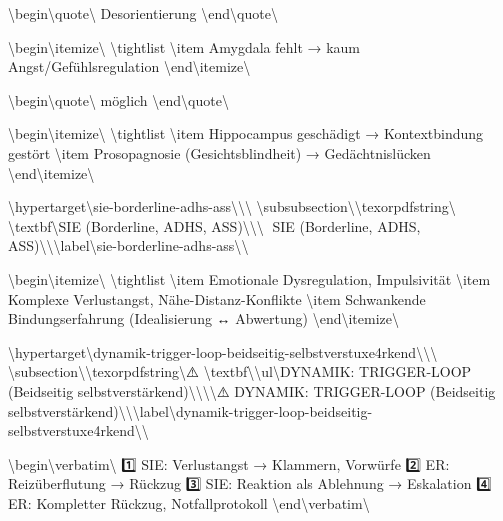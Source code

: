 \textbackslash{}begin\textbackslash{}{quote\textbackslash{}}
Desorientierung
\textbackslash{}end\textbackslash{}{quote\textbackslash{}}

\textbackslash{}begin\textbackslash{}{itemize\textbackslash{}}
\textbackslash{}tightlist
\textbackslash{}item
  Amygdala fehlt → kaum Angst/Gefühlsregulation
\textbackslash{}end\textbackslash{}{itemize\textbackslash{}}

\textbackslash{}begin\textbackslash{}{quote\textbackslash{}}
möglich
\textbackslash{}end\textbackslash{}{quote\textbackslash{}}

\textbackslash{}begin\textbackslash{}{itemize\textbackslash{}}
\textbackslash{}tightlist
\textbackslash{}item
  Hippocampus geschädigt → Kontextbindung gestört
\textbackslash{}item
  Prosopagnosie (Gesichtsblindheit) → Gedächtnislücken
\textbackslash{}end\textbackslash{}{itemize\textbackslash{}}

\textbackslash{}hypertarget\textbackslash{}{sie-borderline-adhs-ass\textbackslash{}}\textbackslash{}{\textbackslash{}%
\textbackslash{}subsubsection\textbackslash{}{\textbackslash{}texorpdfstring\textbackslash{}{🔴 \textbackslash{}textbf\textbackslash{}{SIE (Borderline, ADHS, ASS)\textbackslash{}}\textbackslash{}}\textbackslash{}{🔴 SIE (Borderline, ADHS, ASS)\textbackslash{}}\textbackslash{}}\textbackslash{}label\textbackslash{}{sie-borderline-adhs-ass\textbackslash{}}\textbackslash{}}

\textbackslash{}begin\textbackslash{}{itemize\textbackslash{}}
\textbackslash{}tightlist
\textbackslash{}item
  Emotionale Dysregulation, Impulsivität
\textbackslash{}item
  Komplexe Verlustangst, Nähe-Distanz-Konflikte
\textbackslash{}item
  Schwankende Bindungserfahrung (Idealisierung ↔ Abwertung)
\textbackslash{}end\textbackslash{}{itemize\textbackslash{}}

\textbackslash{}hypertarget\textbackslash{}{dynamik-trigger-loop-beidseitig-selbstverstuxe4rkend\textbackslash{}}\textbackslash{}{\textbackslash{}%
\textbackslash{}subsection\textbackslash{}{\textbackslash{}texorpdfstring\textbackslash{}{⚠️ \textbackslash{}textbf\textbackslash{}{\textbackslash{}ul\textbackslash{}{DYNAMIK: TRIGGER-LOOP (Beidseitig selbstverstärkend)\textbackslash{}}\textbackslash{}}\textbackslash{}}\textbackslash{}{⚠️ DYNAMIK: TRIGGER-LOOP (Beidseitig selbstverstärkend)\textbackslash{}}\textbackslash{}}\textbackslash{}label\textbackslash{}{dynamik-trigger-loop-beidseitig-selbstverstuxe4rkend\textbackslash{}}\textbackslash{}}

\textbackslash{}begin\textbackslash{}{verbatim\textbackslash{}}
1️⃣ SIE: Verlustangst 			→ Klammern, Vorwürfe
2️⃣ ER: Reizüberflutung 			→ Rückzug
3️⃣ SIE: Reaktion als Ablehnung 	→ Eskalation
4️⃣ ER: Kompletter Rückzug, Notfallprotokoll
\textbackslash{}end\textbackslash{}{verbatim\textbackslash{}}

